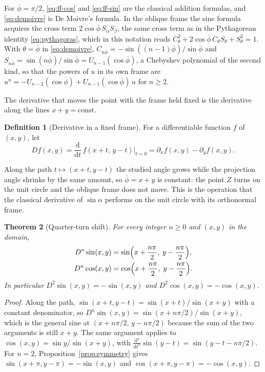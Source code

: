 \documentclass[11pt]{amsart}
\newtheorem{thm}{Theorem}[section]
\theoremstyle{definition}
\newtheorem{defn}[thm]{Definition}
\theoremstyle{remark}
\numberwithin{equation}{section}
\newcommand{\pb}{\overline{\phi}}
\begin{document}
For $\pb = \pi/2$, \eqref{eq:ff-cos} and \eqref{eq:ff-sin} are the classical
addition formulas, and \eqref{eq:demoivre} is De Moivre's formula. In the
oblique frame the sine formula acquires the cross term
$2\cos\pb\,S_\alpha S_\beta$, the same cross term as in the Pythagorean
identity \eqref{eq:pythagoras}, which in this notation reads
$C_\theta^2 + 2\cos\pb\,C_\theta S_\theta + S_\theta^2 = 1$. With $\theta = \pb$
in \eqref{eq:demoivre}, $C_{n\pb} = -\sin((n-1)\pb)/\sin\pb$ and
$S_{n\pb} = \sin(n\pb)/\sin\pb = U_{n-1}(\cos\pb)$, a Chebyshev polynomial of
the second kind, so that the powers of $u$ in its own frame are
$u^n = -U_{n-2}(\cos\pb) + U_{n-1}(\cos\pb)\,u$ for $n \ge 2$.

The derivative that moves the point with the frame held fixed is the
derivative along the lines $x + y = \text{const}$.

\begin{defn}[Derivative in a fixed frame]
\label{defn:D}
For a differentiable function $f$ of $(x,y)$, let
\[
Df(x,y) = \frac{\mathrm{d}}{\mathrm{d}t}\, f(x+t,\,y-t)\Big|_{t=0}
= \partial_x f(x,y) - \partial_y f(x,y).
\]
\end{defn}

Along the path $t \mapsto (x+t, y-t)$ the studied angle grows while the
projection angle shrinks by the same amount, so $\pb = x+y$ is constant:
the point $Z$ turns on the unit circle and the oblique frame does not
move. This is the operation that the classical derivative of $\sin\alpha$
performs on the unit circle with its orthonormal frame.

\begin{thm}[Quarter-turn shift]
\label{thm:shift}
For every integer $n \ge 0$ and $(x,y)$ in the domain,
\begin{gather}
\label{eq:shift}
D^n \sin(x,y) = \sin\Bigl(x + \frac{n\pi}{2},\; y - \frac{n\pi}{2}\Bigr), \\
\label{eq:shift-cos}
D^n \cos(x,y) = \cos\Bigl(x + \frac{n\pi}{2},\; y - \frac{n\pi}{2}\Bigr).
\end{gather}
In particular $D^2\sin(x,y) = -\sin(x,y)$ and $D^2\cos(x,y) = -\cos(x,y)$.
\end{thm}

\begin{proof}
Along the path, $\sin(x+t,y-t) = \sin(x+t)/\sin(x+y)$ with a constant
denominator, so $D^n\sin(x,y) = \sin(x+n\pi/2)/\sin(x+y)$, which is the
general sine at $(x + n\pi/2,\, y - n\pi/2)$ because the sum of the two
arguments is still $x+y$. The same argument applies to
$\cos(x,y) = \sin y/\sin(x+y)$, with $\frac{\mathrm d^n}{\mathrm dt^n}\sin(y-t)
= \sin(y - t - n\pi/2)$. For $n = 2$, Proposition~\ref{prop:symmetry} gives
$\sin(x+\pi, y-\pi) = -\sin(x,y)$ and $\cos(x+\pi,y-\pi) = -\cos(x,y)$.
\end{proof}
\end{document}
